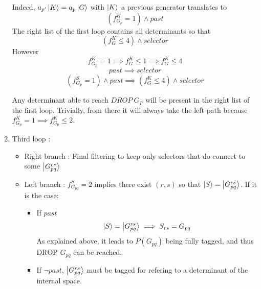 \documentclass[./thesis.tex]{subfiles}
\newcommand{\Gpqrs}{\ket{G^{rs}_{pq}}}
\begin{document}
\begin{enumerate}
Indeed, $a_{p'} \ket K = a_p \ket G$ with $\ket K$ a previous generator translates to
\begin{equation}
(f^K_{G_{p}} = 1) \wedge past
\end{equation}
The right list of the first loop contains all determinants so that
\begin{equation}
(f^K_G \leq 4) \wedge selector
\end{equation}
However 
\begin{equation}
f^K_{G_{p}} = 1 \implies f^K_G \leq 1 \implies f^K_G \leq 4
\end{equation}
\begin{equation}
past \implies selector
\end{equation}
\begin{equation}
(f^S_{G_{p}} = 1) \wedge past \implies (f^K_G \leq 4) \wedge selector
\end{equation}

Any determinant able to reach $DROP\ G_P$ will be present in the right list of the first loop. Trivially, from there it will always take the left path because $f^K_{G_{p}} = 1 \implies f^K_{G_{p}} \leq 2$.

\item
Third loop :
\begin{itemize}

\item
Right branch :
Final filtering to keep only selectors that do connect to some $\Gpqrs$
\item
Left branch : $f_{G_{pq}}^S = 2$ implies there exist $(r,s)$ so that $\ket S=\Gpqrs$. If it is the case:
\begin{itemize}
\item
If $past$
\begin{equation}
\ket S=\ket {G_{pq}^{rs}} \implies S_{rs} = G_{pq}
\end{equation}
As explained above, it leads to $P(G_{pq})$ being fully tagged, and thus $\text{DROP } G_{pq}$ can be reached.
\item
If $\neg past$, $\ket {G_{pq}^{rs}}$ must be tagged for refering to a determinant of the internal space.
\end{itemize}



\end{itemize}

\end{enumerate}



\newcommand{\Gpq}{\ket {G_{pq}}}
\newcommand{\Gpbq}{\ket {G_{p \bar q}}}
\end{document}
